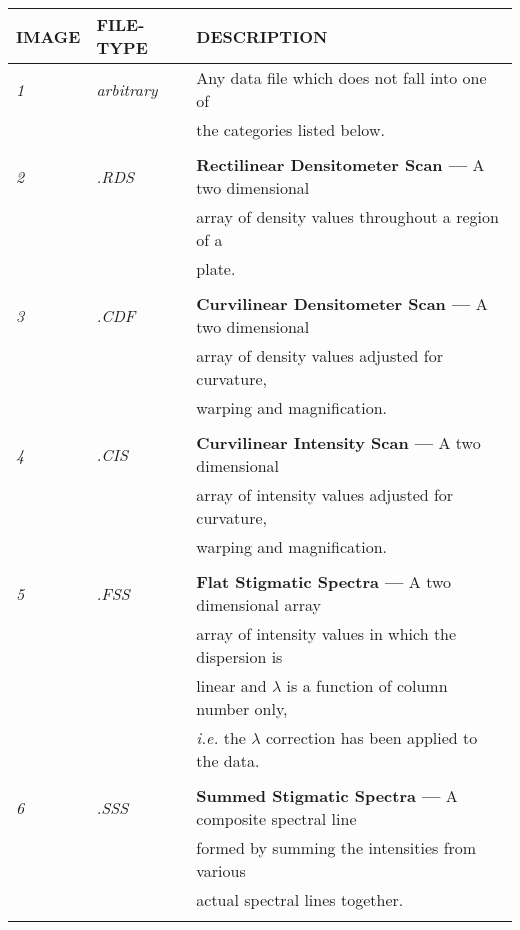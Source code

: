 \begin{center}
\begin{tabular}{||l l l||}
\hline
{\bf IMAGE} & {\bf FILE-TYPE} & {\bf DESCRIPTION}\\
\hline
{\em 1} & {\em arbitrary} & Any data file which does not fall into one of \\
        &                 & the categories listed below.\\
        &                 &                             \\

{\em 2} & {\em .RDS} & {\bf Rectilinear Densitometer Scan ---} A two dimensional 
\\
        &            &      array of density values throughout a region of a \\
        &            &      plate.\\
        &            &            \\
  
{\em 3} & {\em .CDF} & {\bf Curvilinear Densitometer Scan ---} A two dimensional 
\\
        &            &      array of density values adjusted for curvature,\\
        &            &      warping and magnification.\\
        &            &                                \\

{\em 4} & {\em .CIS} & {\bf Curvilinear Intensity Scan ---} A two dimensional \\
        &            &      array of intensity values adjusted for curvature,\\
        &            &      warping and magnification.\\
        &            &                                \\

{\em 5} & {\em .FSS} & {\bf Flat Stigmatic Spectra ---} A two dimensional array \\
        &            & array of intensity values in which the dispersion is \\
        &   & linear and $\lambda$ is a function of column number only,\\
  &  &    {\it i.e.} the $\lambda$ correction has been applied to the data. \\
  &    &  \\

{\em 6} & {\em .SSS} & {\bf Summed Stigmatic Spectra ---} A composite spectral 
line \\    
  &   &  formed by summing the intensities from various \\
  &   &    actual spectral lines together.\\
  &   &  \\


\end{tabular}
\end{center}
